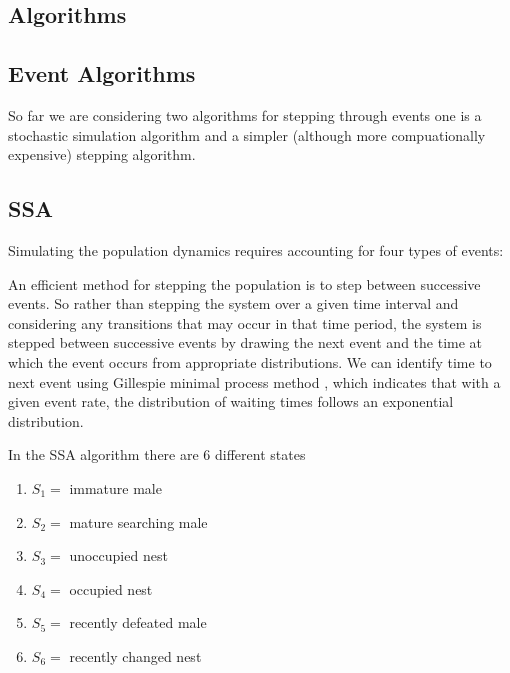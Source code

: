 \documentclass[a4paper,11pt]{article}
\begin{document}
\subsection{Algorithms}
\subsection{Event Algorithms}
So far we are considering two algorithms for stepping through events one is a stochastic simulation algorithm and a simpler (although more compuationally expensive) stepping algorithm.
\subsection{SSA}
Simulating the population dynamics requires accounting for four types of events:

An efficient method for stepping the population is to step between successive events. So rather than stepping the system over a given time interval and considering any transitions that may occur in that time period, the system is stepped between successive events by drawing the next event and the time at which the event occurs from appropriate distributions.  We can identify time to next event using Gillespie minimal process method \citep{Gillespie-1976}, which indicates that with a given event rate, the distribution of waiting times follows an exponential distribution.


In the SSA algorithm \citep{Gillespie-1976} there are 6 different states
\begin{enumerate}
    \item $S_1 = $ immature male
    \item $S_2 = $ mature searching male
    \item $S_3 = $ unoccupied nest
    \item $S_4 = $ occupied nest
    \item $S_5 = $ recently defeated male
    \item $S_6 = $ recently changed nest
\end{enumerate}
\end{document}
